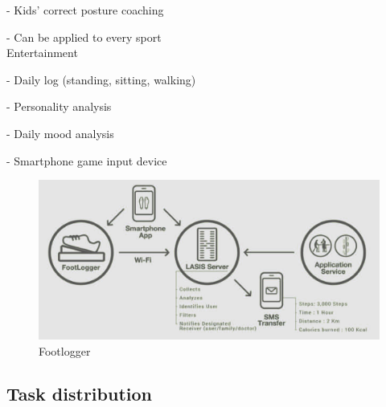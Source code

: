 \documentclass[conference]{IEEEtran}
\begin{document}
- Kids' correct posture coaching

- Can be applied to every sport\\

Entertainment

-  Daily log (standing, sitting, walking)

-  Personality analysis

-  Daily mood analysis

-  Smartphone game input device\\

\begin{figure}[H]
\begin{center}
    \includegraphics[scale=0.33]{img_05.jpg}
    \caption{Footlogger} 
\end{center}
\end{figure}

\subsection{Task distribution}

\renewcommand{\arrayrulewidth}{1pt}
\end{document}
